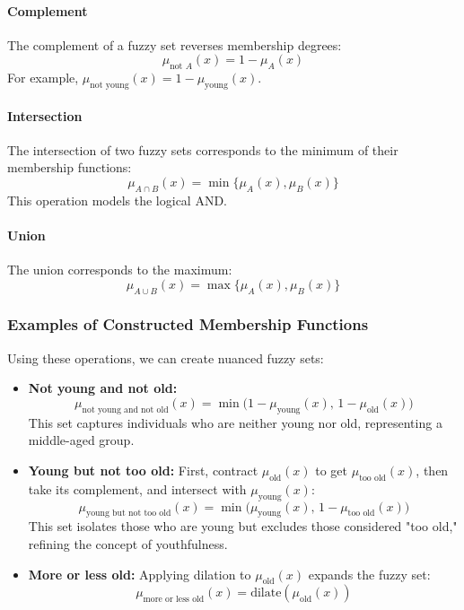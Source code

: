 \paragraph{Complement}
The complement of a fuzzy set reverses membership degrees:
\[
\mu_{\text{not } A}(x) = 1 - \mu_A(x)
\]
For example, \(\mu_{\text{not young}}(x) = 1 - \mu_{\text{young}}(x)\).

\paragraph{Intersection}
The intersection of two fuzzy sets corresponds to the minimum of their membership functions:
\[
\mu_{A \cap B}(x) = \min\{\mu_A(x), \mu_B(x)\}
\]
This operation models the logical AND.

\paragraph{Union}
The union corresponds to the maximum:
\[
\mu_{A \cup B}(x) = \max\{\mu_A(x), \mu_B(x)\}
\]

\subsubsection{Examples of Constructed Membership Functions}
\label{sec:fuzzysets_examples_of_constructed_membership_functions_sub}

Using these operations, we can create nuanced fuzzy sets:

\begin{itemize}
    \item \textbf{Not young and not old:}
    \[
    \mu_{\text{not young and not old}}(x) = \min\big(1 - \mu_{\text{young}}(x),\, 1 - \mu_{\text{old}}(x)\big)
    \]
    This set captures individuals who are neither young nor old, representing a middle-aged group.

    \item \textbf{Young but not too old:}
    First, contract \(\mu_{\text{old}}(x)\) to get \(\mu_{\text{too old}}(x)\), then take its complement, and intersect with \(\mu_{\text{young}}(x)\):
    \[
    \mu_{\text{young but not too old}}(x) = \min\big(\mu_{\text{young}}(x),\, 1 - \mu_{\text{too old}}(x)\big)
    \]
    This set isolates those who are young but excludes those considered "too old," refining the concept of youthfulness.

    \item \textbf{More or less old:}
    Applying dilation to \(\mu_{\text{old}}(x)\) expands the fuzzy set:
    \[
    \mu_{\text{more or less old}}(x) = \text{dilate}(\mu_{\text{old}}(x))
    \]
\end{itemize}

